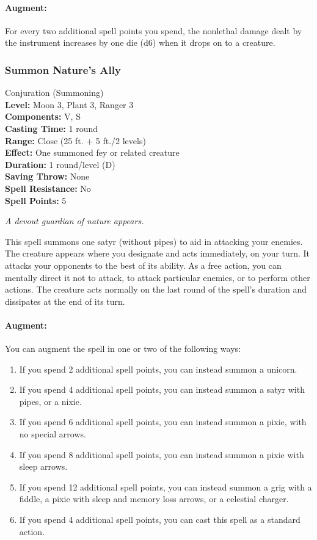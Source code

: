 \paragraph{Augment:} For every two additional spell points you spend, the nonlethal damage dealt by the instrument increases by one die (d6) when it drops on to a creature.
\subsubsection{Summon Nature's Ally}
\label{Spell:SummonNaturesAlly}
Conjuration (Summoning)
\\ \textbf{Level:} Moon 3, Plant 3, Ranger 3
\\ \textbf{Components:} V, S
\\ \textbf{Casting Time:} 1 round
\\ \textbf{Range:} Close (25 ft. + 5 ft./2 levels)
\\ \textbf{Effect:} One summoned fey or related creature
\\ \textbf{Duration:} 1 round/level (D)
\\ \textbf{Saving Throw:} None
\\ \textbf{Spell Resistance:} No
\\ \textbf{Spell Points:} 5

\emph{A devout guardian of nature appears.}

This spell summons one satyr (without pipes) to aid in attacking your enemies.
The creature appears where you designate and acts immediately, on your turn. 
It attacks your opponents to the best of its ability. 
As a free action, you can mentally direct it not to attack, to attack particular enemies, or to perform other actions. 
The creature acts normally on the last round of the spell's duration and dissipates at the end of its turn.

\paragraph{Augment:} You can augment the spell in one or two of the following ways: 
\begin{enumerate}
 \item If you spend 2 additional spell points, you can instead summon a unicorn.
 \item If you spend 4 additional spell points, you can instead summon a satyr with pipes, or a nixie.
 \item If you spend 6 additional spell points, you can instead summon a pixie, with no special arrows.
 \item If you spend 8 additional spell points, you can instead summon a pixie with sleep arrows.
 \item If you spend 12 additional spell points, you can instead summon a grig with a fiddle, a pixie with sleep and memory loss arrows, or a celestial charger.
 \item If you spend 4 additional spell points, you can cast this spell as a standard action.
\end{enumerate}

